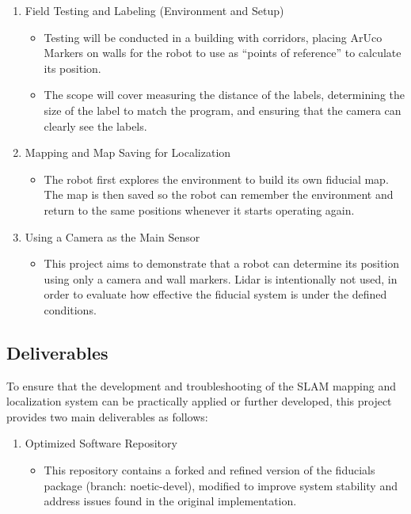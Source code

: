 \documentclass[10pt]{article}
\begin{document}
\begin{enumerate}
    \item Field Testing and Labeling (Environment and Setup)
    \begin{itemize}
        \item Testing will be conducted in a building with corridors, placing ArUco Markers on walls for the robot to use as ``points of reference'' to calculate its position.
        \item The scope will cover measuring the distance of the labels, determining the size of the label to match the program, and ensuring that the camera can clearly see the labels.
    \end{itemize}
    \item Mapping and Map Saving for Localization
    \begin{itemize}
        \item The robot first explores the environment to build its own fiducial map. The map is then saved so the robot can remember the environment and return to the same positions whenever it starts operating again.
    \end{itemize}
    \item Using a Camera as the Main Sensor
    \begin{itemize}
        \item This project aims to demonstrate that a robot can determine its position using only a camera and wall markers. Lidar is intentionally not used, in order to evaluate how effective the fiducial system is under the defined conditions.
    \end{itemize}
\end{enumerate}

\subsection{Deliverables}

To ensure that the development and troubleshooting of the SLAM mapping and localization system can be practically applied or further developed, this project provides two main deliverables as follows:

\begin{enumerate}
    \item Optimized Software Repository
    \begin{itemize}
        \item This repository contains a forked and refined version of the fiducials package (branch: noetic-devel), modified to improve system stability and address issues found in the original implementation.
    \end{itemize}
\end{enumerate}
\end{document}
